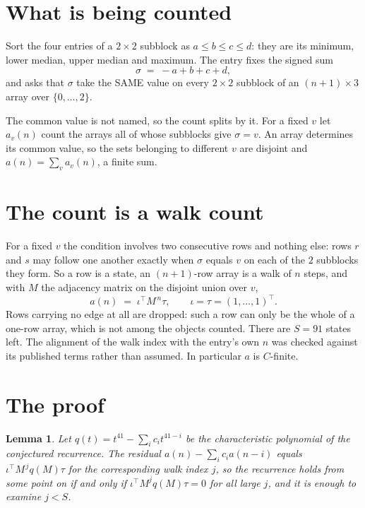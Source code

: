 \documentclass[11pt,a4paper]{article}
\theoremstyle{plain}
\newtheorem{lemma}[theorem]{Lemma}
\theoremstyle{definition}
\begin{document}
\section{What is being counted}

Sort the four entries of a $2\times2$ subblock as $a\le b\le c\le d$: they
are its minimum, lower median, upper median and maximum. The entry fixes the signed sum
\[
\sigma\;=\;-a+b+c+d,
\]
and asks that $\sigma$ take the SAME value on every $2\times2$ subblock of an
$(n+1)\times3$ array over $\{0,\dots,2\}$.

The common value is not named, so the count splits by it. For a fixed $v$ let $a_v(n)$ count
the arrays all of whose subblocks give $\sigma=v$. An array determines its common value, so
the sets belonging to different $v$ are disjoint and $a(n)=\sum_v a_v(n)$, a finite sum.


\section{The count is a walk count}

For a fixed $v$ the condition involves two consecutive rows and nothing
else: rows $r$ and $s$ may follow one another exactly when $\sigma$ equals $v$ on each of the
$2$ subblocks they form. So a row is a state, an $(n+1)$-row array is a walk of $n$
steps, and with $M$ the adjacency matrix on the disjoint union over $v$,
\[
a(n)\;=\;\iota^{\!\top}M^{\,n}\tau,\qquad\iota=\tau=(1,\dots,1)^{\!\top} .
\]
Rows carrying no edge at all are dropped: such a row can only be the whole of a one-row
array, which is not among the objects counted. There are $S=91$ states left.
The alignment of the walk index with the entry's own $n$ was checked against its published
terms rather than assumed. In particular $a$ is $C$-finite.

\section{The proof}

\begin{lemma}\label{lem:crit}
Let $q(t)=t^{41}-\sum_i c_it^{41-i}$ be the characteristic polynomial of the
conjectured recurrence. The residual $a(n)-\sum_ic_ia(n-i)$ equals
$\iota^{\!\top}M^{\,j}q(M)\tau$ for the corresponding walk index $j$, so the recurrence
holds from some point on if and only if $\iota^{\!\top}M^{j}q(M)\tau=0$ for all large $j$,
and it is enough to examine $j<S$.
\end{lemma}
\end{document}
